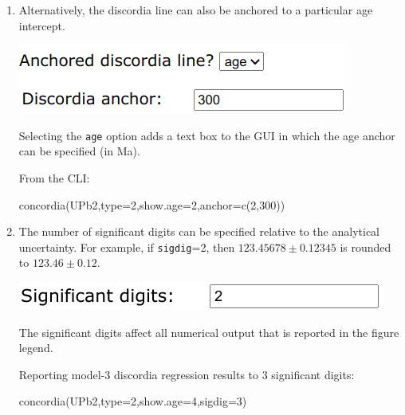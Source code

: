 \begin{refsection}
\begin{enumerate}
\item Alternatively, the discordia line can also be anchored to a
  particular age intercept.

\noindent\begin{minipage}[t]{.4\linewidth}
\strut\vspace*{-\baselineskip}\newline
\includegraphics[width=\linewidth]{../figures/discordiaageanchor.png}
\end{minipage}
\begin{minipage}[t]{.6\linewidth}
  Selecting the \texttt{age} option adds a text box to the GUI in
  which the age anchor can be specified (in Ma).
\end{minipage}

From the CLI:
\begin{console}
concordia(UPb2,type=2,show.age=2,anchor=c(2,300))
\end{console}

\item The number of significant digits can be specified relative to
  the analytical uncertainty. For example, if \texttt{sigdig}=2, then
  $123.45678 \pm 0.12345$ is rounded to $123.46 \pm 0.12$.

\noindent\begin{minipage}[t]{.4\linewidth}
\strut\vspace*{-\baselineskip}\newline
\includegraphics[width=\linewidth]{../figures/sigdig.png}
\end{minipage}
\begin{minipage}[t]{.6\linewidth}
  The significant digits affect all numerical output that is reported
  in the figure legend.
\end{minipage}

Reporting model-3 discordia regression results to 3 significant
digits:
\begin{console}
concordia(UPb2,type=2,show.age=4,sigdig=3)
\end{console}


\end{enumerate}
\end{refsection}
